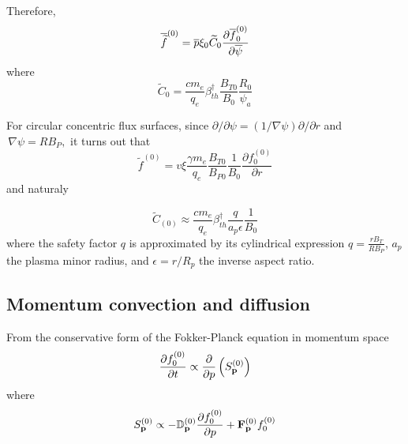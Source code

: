 Therefore, 
\begin{equation}
\overline{\widetilde{f}}^{\left( 0\right) }=\overline{p}\xi _{0}\widetilde{C}%
_{0}\frac{\partial \overline{f}_{0}^{\left( 0\right) }}{\partial \overline{%
\psi }}
\end{equation}
where 
\begin{equation}
\widetilde{C}_{0}=\frac{cm_{e}}{q_{e}}\beta _{th}^{\dag }\frac{B_{T0}}{B_{0}}%
\frac{R_{0}}{\psi _{a}}
\end{equation}

For circular concentric flux surfaces, since $\partial /\partial \psi
=\left( 1/\nabla \psi \right) \partial /\partial r$ and $\,\nabla \psi
=RB_{P},$ it turns out that 
\begin{equation}
\widetilde{f}^{\left( 0\right) }=v\xi \frac{\gamma m_{e}}{q_{e}}\frac{B_{T0}%
}{B_{P0}}\frac{1}{B_{0}}\frac{\partial f_{0}^{\left( 0\right) }}{\partial r}
\end{equation}
and naturaly

\begin{equation}
\widetilde{C}_{\left( 0\right) }\approx \frac{cm_{e}}{q_{e}}\beta
_{th}^{\dag }\frac{q}{a_{p}\epsilon }\frac{1}{B_{0}}
\end{equation}
where the safety factor $q$ is approximated by its cylindrical expression $q=%
\frac{rB_{T}}{RB_{P}}$, $a_{p}$ the plasma minor radius, and $\epsilon
=r/R_{p}$ the inverse aspect ratio.

\subsection{Momentum convection and diffusion}

From the conservative form of the Fokker-Planck equation in momentum space 
\begin{equation}
\frac{\partial f_{0}^{\left( 0\right) }}{\partial t}\propto \frac{\partial }{%
\partial p}\left( S_{\mathbf{p}}^{\left( 0\right) }\right)
\end{equation}
where 
\begin{equation}
S_{\mathbf{p}}^{\left( 0\right) }\propto -\mathbb{D}_{\mathbf{p}}^{\left(
0\right) }\frac{\partial f_{0}^{\left( 0\right) }}{\partial p}+\mathbf{F}_{%
\mathbf{p}}^{\left( 0\right) }f_{0}^{\left( 0\right) }
\end{equation}

